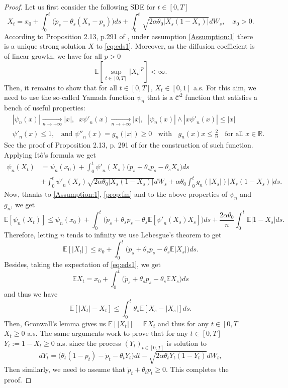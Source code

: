 \documentclass[11pt]{article}
\theoremstyle{definition}
\begin{document}
\begin{proof}
Let us first consider the following SDE for $t\in[0,T]$
\begin{equation}\label{eq:eds1}
X_t=x_0+  \int_0^t\big(\dot p_s - \theta_s(X_s-p_s)  \big)ds  + \int_0^t\sqrt{2\alpha \theta_0 |X_s(1-X_s)|} dW_s, \quad x_0>0.
\end{equation}
According to Proposition 2.13, p.291 of \cite{KarShr}, under assumption  \eqref{Assumption:1} there is a unique strong solution $X$ to \eqref{eq:eds1}. Moreover, as the diffusion coefficient is of linear growth, we have  for all $p>0$ 
\begin{equation}\label{prop:fm}
\mathbb E[ \sup_{t\in[0,T]}|X_t|^p]<\infty.
\end{equation}
Then, it remains to show that for all $t\in[0,T]$, $X_t\in[0,1]$ a.s. For this aim, we need to use the so-called Yamada function $\psi_n$ that is a $\mathcal C^2$ function that satisfies a bench of useful properties:
\begin{align*}
&|\psi_n(x)|\underset{n\rightarrow+\infty}{\rightarrow}|x|, \;\; x{\psi'}_n(x)\underset{n\rightarrow+\infty}{\rightarrow}|x|, \;\; |\psi_n(x)|\wedge |x{\psi'}_n(x)| \le |x|\\
&{\psi'}_n(x)\le 1, \;\; \mbox{ and } {\psi''}_n(x)=g_n(|x|)\ge 0\;\; \mbox{ with } \;\; g_n(x)x\le \frac 2n\;\;  \mbox{ for all } x\in \mathbb R .
\end{align*}
See the proof of Proposition 2.13, p. 291 of \cite{KarShr} for the construction of such function.
Applying Itô's formula we get
\begin{align*}
\psi_n(X_t)&=\psi_n(x_0) +\int_0^t {\psi'}_n(X_s)(\dot p_s + \theta_s p_s - \theta_sX_s  \big)ds \\
&+ \int_0^t{\psi'}_n(X_s)\sqrt{2\alpha \theta_0 |X_s(1-X_s)|} dW_s + \alpha \theta_0 \int_0^t  g_n(|X_s|) |X_s(1-X_s)|ds.
\end{align*}
Now, thanks to  \eqref{Assumption:1}, \eqref{prop:fm} and to the above properties of $\psi_n$ and $g_n$, we get
$$
\mathbb E[\psi_n(X_t)]\le \psi_n(x_0) +\int_0^t \big(\dot p_s + \theta_sp_s -  \theta_s \mathbb E[{\psi'}_n(X_s)X_s] \big)ds + \frac{2\alpha  \theta_0}{n}\int_0^t \mathbb E |1-X_s|ds.
$$
Therefore, letting $n$ tends to infinity we use Lebesgue's theorem to get
$$
\mathbb E[|X_t|]\le x_0 +\int_0^t \big(\dot p_s + \theta_sp_s -  \theta_s \mathbb E|X_s| \big)ds.
$$
Besides, taking the expectation of \eqref{eq:eds1}, we get
$$
\mathbb E X_t=x_0+  \int_0^t\big(\dot p_s +\theta_sp_s - \theta_s \mathbb EX_s  \big)ds
$$
and thus we have 
$$
\mathbb E[|X_t| -X_t ]\le \int_0^t \theta_s \mathbb E[ X_s - |X_s| ]ds.
$$
Then, Gronwall's lemma gives us $\mathbb E[|X_t|]=\mathbb E X_t$ and thus for any $t\in[0,T]$ $X_t\ge0$ a.s. The same arguments work to prove that  for any $t\in[0,T]$ $Y_t:=1-X_t\ge0$  a.s.  since the process $(Y_t)_{t\in[0,T]}$ is solution to 
$$
dY_t= \big( \theta_t(1-p_t) -\dot p_t - \theta_tY_t  \big)dt  -\sqrt{2\alpha \theta_tY_t(1-Y_t)} dW_t,
$$
Then similarly, we need to assume that $\dot p_t +\theta_tp_t\ge 0$. This completes the proof.
\end{proof}
\end{document}
